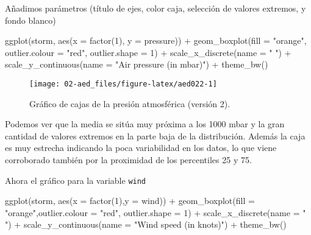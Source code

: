 \documentclass[
]{book}
\newenvironment{Shaded}{\begin{snugshade}}{\end{snugshade}}
\newcommand{\AttributeTok}[1]{\textcolor[rgb]{0.77,0.63,0.00}{#1}}
\newcommand{\DecValTok}[1]{\textcolor[rgb]{0.00,0.00,0.81}{#1}}
\newcommand{\FunctionTok}[1]{\textcolor[rgb]{0.00,0.00,0.00}{#1}}
\newcommand{\NormalTok}[1]{#1}
\newcommand{\SpecialCharTok}[1]{\textcolor[rgb]{0.00,0.00,0.00}{#1}}
\newcommand{\StringTok}[1]{\textcolor[rgb]{0.31,0.60,0.02}{#1}}
\begin{document}
Añadimos parámetros (título de ejes, color caja, selección de valores extremos, y fondo blanco)

\begin{Shaded}
\begin{Highlighting}[]
\FunctionTok{ggplot}\NormalTok{(storm, }\FunctionTok{aes}\NormalTok{(}\AttributeTok{x =} \FunctionTok{factor}\NormalTok{(}\DecValTok{1}\NormalTok{), }\AttributeTok{y =}\NormalTok{ pressure)) }\SpecialCharTok{+}
   \FunctionTok{geom\_boxplot}\NormalTok{(}\AttributeTok{fill =} \StringTok{"orange"}\NormalTok{, }\AttributeTok{outlier.colour =} \StringTok{"red"}\NormalTok{, }\AttributeTok{outlier.shape =} \DecValTok{1}\NormalTok{) }\SpecialCharTok{+}
   \FunctionTok{scale\_x\_discrete}\NormalTok{(}\AttributeTok{name =} \StringTok{" "}\NormalTok{) }\SpecialCharTok{+} \FunctionTok{scale\_y\_continuous}\NormalTok{(}\AttributeTok{name =} \StringTok{"Air pressure (in mbar)"}\NormalTok{) }\SpecialCharTok{+}
   \FunctionTok{theme\_bw}\NormalTok{()}
\end{Highlighting}
\end{Shaded}

\begin{figure}

{\centering \texttt{[image: 02-aed\_files/figure-latex/aed022-1]} 

}

\caption{Gráfico de cajas de la presión atmosférica (versión 2).}\label{fig:aed022}
\end{figure}

Podemos ver que la media se sitúa muy próxima a los 1000 mbar y la gran cantidad de valores extremos en la parte baja de la distribución. Además la caja es muy estrecha indicando la poca variabilidad en los datos, lo que viene corroborado también por la proximidad de los percentiles 25 y 75.

Ahora el gráfico para la variable \texttt{wind}

\begin{Shaded}
\begin{Highlighting}[]
\FunctionTok{ggplot}\NormalTok{(storm, }\FunctionTok{aes}\NormalTok{(}\AttributeTok{x =} \FunctionTok{factor}\NormalTok{(}\DecValTok{1}\NormalTok{),}\AttributeTok{y =}\NormalTok{ wind)) }\SpecialCharTok{+}
   \FunctionTok{geom\_boxplot}\NormalTok{(}\AttributeTok{fill =} \StringTok{"orange"}\NormalTok{,}\AttributeTok{outlier.colour =} \StringTok{"red"}\NormalTok{, }\AttributeTok{outlier.shape =} \DecValTok{1}\NormalTok{) }\SpecialCharTok{+}
   \FunctionTok{scale\_x\_discrete}\NormalTok{(}\AttributeTok{name =} \StringTok{" "}\NormalTok{) }\SpecialCharTok{+} \FunctionTok{scale\_y\_continuous}\NormalTok{(}\AttributeTok{name =} \StringTok{"Wind speed (in knots)"}\NormalTok{) }\SpecialCharTok{+}
   \FunctionTok{theme\_bw}\NormalTok{()}
\end{Highlighting}
\end{Shaded}
\end{document}
